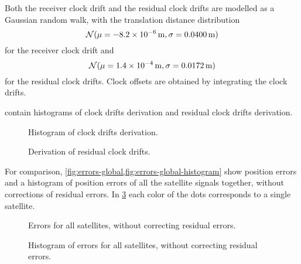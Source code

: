 Both the receiver clock drift and the residual clock drifts are modelled as a Gaussian random walk,
with the translation distance distribution
\begin{equation}
\operatorname{\mathcal{N}}(\mu = \SI{-8.2e-06}{\meter}, \sigma = \SI{0.0400}{\meter})
\end{equation}
for the receiver clock drift and 
\begin{equation}
\operatorname{\mathcal{N}}(\mu = \SI{1.4e-4}{\meter}, \sigma = \SI{0.0172}{\meter})
\end{equation}
for the residual clock drifts.
Clock offsets are obtained by integrating the clock drifts.

contain histograms of clock drifts derivation and residual
clock drifts derivation.

\begin{figure}[p]
	\centering
	\noindent{}
	\caption{Histogram of clock drifts derivation.}
	\label{fig:clock-drift-derivation}
\end{figure}

\begin{figure}[p]
	\centering
	\noindent{}
	\caption{Derivation of residual clock drifts.}
	\label{fig:residual-clock-drift-derivation}
\end{figure}

For comparison, \cref{fig:errors-global,fig:errors-global-histogram} show
position errors and a histogram of position errors of all the satellite signals
together, without corrections of residual errors.
In \cref{fig:errors-global} each color of the dots corresponds to a single
satellite.

\begin{figure}[p]
	\centering
	\noindent{}
	\caption{Errors for all satellites, without correcting residual errors.}
	\label{fig:errors-global}
\end{figure}

\begin{figure}[p]
	\centering
	\noindent{}
	\caption{Histogram of errors for all satellites, without correcting residual errors.}
	\label{fig:errors-global-histogram}
\end{figure}

